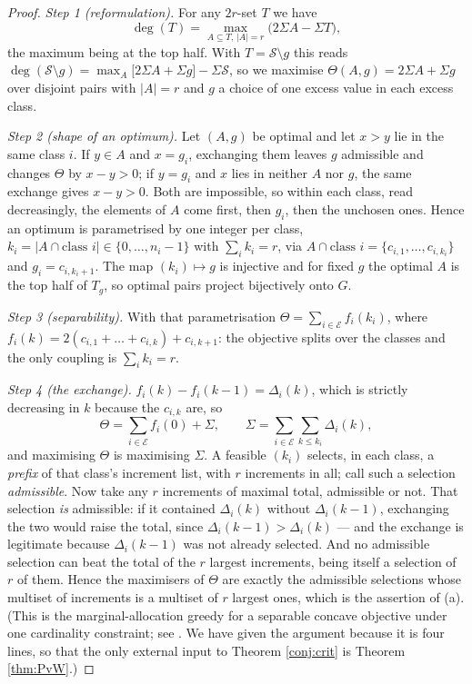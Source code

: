 \documentclass[11pt,reqno]{amsart}
\theoremstyle{plain}
\theoremstyle{definition}
\begin{document}
\begin{proof}
\emph{Step 1 (reformulation).} For any $2r$-set $T$ we have
\[
\deg(T)=\max_{A\subseteq T,\,|A|=r}\bigl(2\Sigma A-\Sigma T\bigr),
\]
the maximum being at the top
half. With $T=\mathcal{S}\setminus g$ this reads
$\deg(\mathcal{S}\setminus g)=\max_A\bigl[2\Sigma A+\Sigma g\bigr]-\Sigma\mathcal{S}$, so we
maximise $\Theta(A,g)=2\Sigma A+\Sigma g$ over disjoint pairs with $|A|=r$ and $g$ a choice of one
excess value in each excess class.

\emph{Step 2 (shape of an optimum).} Let $(A,g)$ be optimal and let $x>y$ lie in the same class $i$.
If $y\in A$ and $x=g_i$, exchanging them leaves $g$ admissible and changes $\Theta$ by $x-y>0$; if
$y=g_i$ and $x$ lies in neither $A$ nor $g$, the same exchange gives $x-y>0$. Both are impossible,
so within each class, read decreasingly, the elements of $A$ come first, then $g_i$, then the
unchosen ones. Hence an optimum is parametrised by one integer per class,
$k_i=|A\cap\text{class }i|\in\{0,\dots,n_i-1\}$ with $\sum_i k_i=r$, via
$A\cap\text{class }i=\{c_{i,1},\dots,c_{i,k_i}\}$ and $g_i=c_{i,k_i+1}$. The map $(k_i)\mapsto g$ is
injective and for fixed $g$ the optimal $A$ is the top half of $T_g$, so optimal pairs project
bijectively onto $G$.

\emph{Step 3 (separability).} With that parametrisation $\Theta=\sum_{i\in\mathcal{E}}f_i(k_i)$,
where $f_i(k)=2(c_{i,1}+\dots+c_{i,k})+c_{i,k+1}$: the objective splits over the classes and the
only coupling is $\sum_i k_i=r$.

\emph{Step 4 (the exchange).} $f_i(k)-f_i(k-1)=\Delta_i(k)$, which is strictly decreasing in $k$
because the $c_{i,k}$ are, so
\[
\Theta=\sum_{i\in\mathcal{E}}f_i(0)+\Sigma,\qquad
\Sigma=\sum_{i\in\mathcal{E}}\sum_{k\le k_i}\Delta_i(k),
\]
and maximising $\Theta$ is maximising $\Sigma$. A feasible $(k_i)$ selects, in each class, a
\emph{prefix} of that class's increment list, with $r$ increments in all; call such a selection
\emph{admissible}. Now take any $r$ increments of maximal total, admissible or not. That selection
\emph{is} admissible: if it contained $\Delta_i(k)$ without $\Delta_i(k-1)$, exchanging the two
would raise the total, since $\Delta_i(k-1)>\Delta_i(k)$ --- and the exchange is legitimate because
$\Delta_i(k-1)$ was not already selected. And no admissible selection can beat the total of the $r$
largest increments, being itself a selection of $r$ of them. Hence the maximisers of $\Theta$ are
exactly the admissible selections whose multiset of increments is a multiset of $r$ largest ones,
which is the assertion of {\rm(a)}. (This is the marginal-allocation greedy for a separable
concave objective under one cardinality constraint; see \cite{FG86,IK88}. We have given the argument
because it is four lines, so that the only external input to Theorem \ref{conj:crit} is
Theorem \ref{thm:PvW}.)


\end{proof}
\end{document}
